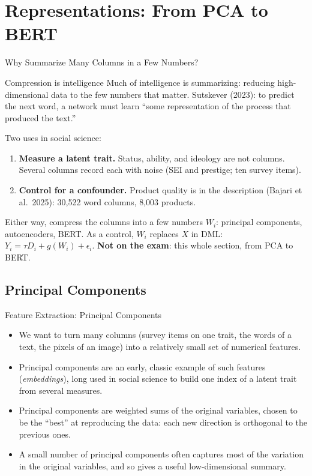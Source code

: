 \documentclass[aspectratio=169,11pt,xcolor=dvipsnames]{beamer}
\newcommand{\srcp}[1]{{\scriptsize\color{gray}(#1)}}
\begin{document}
\section[Representations]{Representations: From PCA to BERT}
\begin{frame}\sectionpage\end{frame}

\begin{frame}{Why Summarize Many Columns in a Few Numbers?}
\begin{block}{Compression is intelligence}
Much of intelligence is summarizing: reducing high-dimensional data to the few numbers that
matter. Sutskever (2023): to predict the next word, a network must learn ``some representation of the
process that produced the text.''
\end{block}
\vskip4pt
Two uses in social science:
\begin{enumerate}\itemsep4pt
  \item \textbf{Measure a latent trait.} Status, ability, and ideology are not columns. Several columns
        record each with noise (SEI and prestige; ten survey items).
  \item \textbf{Control for a confounder.} Product quality is in the description
        \srcp{Bajari et al.\ 2025}: 30,522 word columns, 8,003 products.
\end{enumerate}
\vskip4pt
Either way, compress the columns into a few numbers $W_i$: principal components, autoencoders,
BERT. As a control, $W_i$ replaces $X$ in DML: $Y_i = \tau D_i + g(W_i) + \epsilon_i$.
\vskip3pt
{\small\textcolor{accent}{\textbf{Not on the exam}: this whole section, from PCA to BERT.}}
\end{frame}

\subsection{Principal Components}
\begin{frame}{Feature Extraction: Principal Components}
\begin{itemize}\itemsep6pt
  \item We want to turn many columns (survey items on one trait, the words of a text, the pixels
        of an image) into a relatively small set of numerical features.
  \item Principal components are an early, classic example of such features (\emph{embeddings}),
        long used in social science to build one index of a latent trait from several measures.
  \item Principal components are weighted sums of the original variables, chosen to be the
        ``best'' at reproducing the data: each new direction is orthogonal to the previous ones.
  \item A small number of principal components often captures most of the variation in the
        original variables, and so gives a useful low-dimensional summary.
\end{itemize}
\end{frame}
\end{document}
